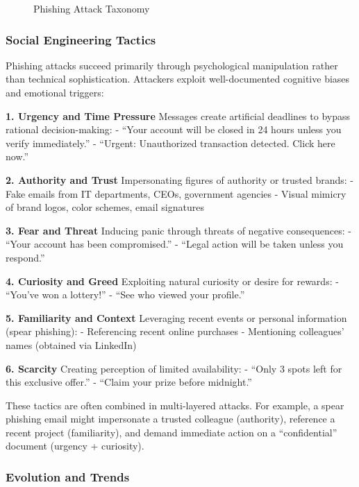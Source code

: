 \begin{figure}
\centering
\caption{Phishing Attack Taxonomy}\label{fig:phishing-taxonomy}
\end{figure}

\subsubsection{Social Engineering
Tactics}\label{social-engineering-tactics}

Phishing attacks succeed primarily through psychological manipulation
rather than technical sophistication. Attackers exploit well-documented
cognitive biases and emotional triggers:

\textbf{1. Urgency and Time Pressure} Messages create artificial
deadlines to bypass rational decision-making: - ``Your account will be
closed in 24 hours unless you verify immediately.'' - ``Urgent:
Unauthorized transaction detected. Click here now.''

\textbf{2. Authority and Trust} Impersonating figures of authority or
trusted brands: - Fake emails from IT departments, CEOs, government
agencies - Visual mimicry of brand logos, color schemes, email
signatures

\textbf{3. Fear and Threat} Inducing panic through threats of negative
consequences: - ``Your account has been compromised.'' - ``Legal action
will be taken unless you respond.''

\textbf{4. Curiosity and Greed} Exploiting natural curiosity or desire
for rewards: - ``You've won a lottery!'' - ``See who viewed your
profile.''

\textbf{5. Familiarity and Context} Leveraging recent events or personal
information (spear phishing): - Referencing recent online purchases -
Mentioning colleagues' names (obtained via LinkedIn)

\textbf{6. Scarcity} Creating perception of limited availability: -
``Only 3 spots left for this exclusive offer.'' - ``Claim your prize
before midnight.''

These tactics are often combined in multi-layered attacks. For example,
a spear phishing email might impersonate a trusted colleague
(authority), reference a recent project (familiarity), and demand
immediate action on a ``confidential'' document (urgency + curiosity).

\subsubsection{Evolution and Trends}\label{evolution-and-trends}

